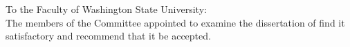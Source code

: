 \label{chap:signatures}

\begin{singlespace}
  \noindent
  \vspace{1.5in}

  \noindent To the Faculty of Washington State University:\\
  
  The members of the Committee appointed to examine the dissertation of
  \medskip
  \uppercase{\myname}
  find it satisfactory and recommend that it be accepted.
  
  \begin{flushright}
    \\
    \\
  \end{flushright}
\end{singlespace}
\newpage
